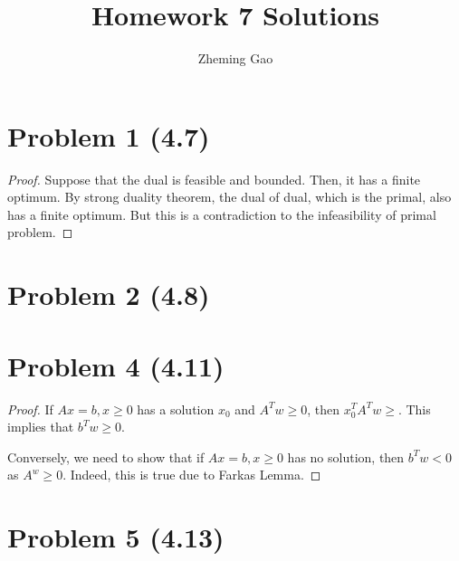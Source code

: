 \documentclass[12pt]{article}
\begin{document}
 
 
\title{Homework 7 Solutions}
\author{Zheming Gao}
\maketitle

\section*{Problem 1 (4.7)}

\begin{proof}

Suppose that the dual is feasible and bounded. Then, it has a finite optimum. By strong duality theorem, the dual of dual, which is the primal, also has a finite optimum. But this is a contradiction to the infeasibility of primal problem.

\end{proof}

\section*{Problem 2 (4.8)}





\section*{Problem 4 (4.11)}


\begin{proof}

If $Ax = b, x\geqslant 0$ has a solution $x_0$ and $A^Tw \geqslant 0$, then $x_0^TA^Tw \geqslant$. This implies that $b^Tw\geqslant 0$.

Conversely, we need to show that if $Ax = b, x\geqslant 0$ has no solution, then $b^Tw <0$ as $A^w \geqslant 0$. Indeed, this is true due to Farkas Lemma.

\end{proof}

\section*{Problem 5 (4.13)}
\end{document}
